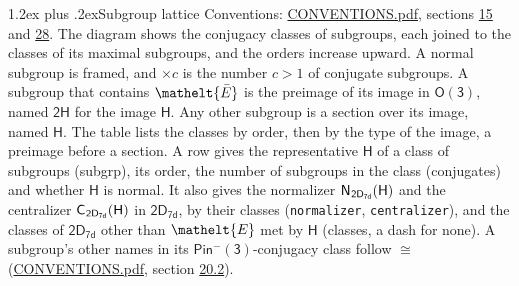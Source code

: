 \documentclass[10pt,a4paper]{article}
\makeatletter
\renewcommand\section{\@startsection{section}{1}{\z@}{-3ex plus -1ex minus -.2ex}%
  {1.2ex plus .2ex}{\normalfont\large\sffamily\bfseries\color{parttitle}}}
\numberwithin{equation}{section}
\newcommand{\eltfont}[1]{{\let\sigma\eltsigma\mathelt{#1}}}
\newcommand{\grp}[1]{\mathsf{#1}}
\newcommand{\cls}[1]{\eltfont{#1}}
\newcommand{\elt}[1]{\eltfont{#1}}
\newcommand{\samecls}{\cong}
\newcommand{\barred}[1]{\bar{#1}}
\newcommand{\hairsp}{\mkern1mu}
\makeatother
\begin{document}
\section{Subgroup lattice}\label{s:subgroups}
Conventions: \href{../../CONVENTIONS.pdf}{CONVENTIONS.pdf}, sections \href{../../../rotation/CONVENTIONS.pdf\#conv.15}{15} and \href{../../CONVENTIONS.pdf\#conv.28}{28}.
The diagram shows the conjugacy classes of subgroups, each joined to the classes of its maximal subgroups, and the orders increase upward. A normal subgroup is framed, and ${\times}c$ is the number $c > 1$ of conjugate subgroups. \label{n:group.H}A subgroup that contains $\elt{\barred{E}}$ is the preimage of its image in $\grp{O(3)}$, named $\grp{2H}$ for the image $\grp{H}$. Any other subgroup is a section over its image, named $\grp{H}$. The table lists the classes by order, then by the type of the image, a preimage before a section. \label{n:head.subgroup}\label{n:head.order}\label{n:head.conjugates}\label{n:head.normal}A row gives the representative $\grp{H}$ of a class of subgroups (subgrp), its order, the number of subgroups in the class (conjugates) and whether $\grp{H}$ is normal. \label{n:group.normalizer}\label{n:group.centralizer}\label{n:head.classes}It also gives the normalizer $\grp{N}_{\hairsp \grp{2D_{7d}}}(\grp{H})$ and the centralizer $\grp{C}_{\hairsp \grp{2D_{7d}}}(\grp{H})$ in $\grp{2D_{7d}}$, by their classes (\texttt{normalizer}, \texttt{centralizer}), and the classes of $\grp{2D_{7d}}$ other than $\cls{E}$ met by $\grp{H}$ (classes, a dash for none). A subgroup's other names in its \href{Pinminus3.pdf}{$\grp{Pin^{-}(3)}$}-conjugacy class follow $\samecls$ (\href{../../CONVENTIONS.pdf}{CONVENTIONS.pdf}, section \href{../../CONVENTIONS.pdf\#conv.20.2}{20.2}).
\end{document}
